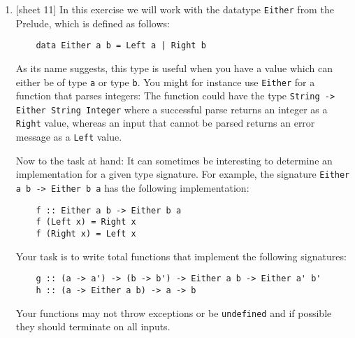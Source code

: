 \documentclass{article}
\def\code#1{\texttt{#1}}
\begin{document}
\begin{enumerate}
    \item {[sheet 11]} In this exercise we will work with the datatype \code{Either} from the Prelude, which is defined as follows:
        \begin{verbatim}
    data Either a b = Left a | Right b
        \end{verbatim}
        As its name suggests, this type is useful when you have a value which can either be of type \code{a} or type \code{b}. You might for instance use \code{Either} for a function that parses integers: The function could have the type \code{String -> Either String Integer} where a successful parse returns an integer as a \code{Right} value, whereas an input that cannot be parsed returns an error message as a \code{Left} value. \par
        Now to the task at hand: It can sometimes be interesting to determine an implementation for a given type signature. For example, the signature \code{Either a b -> Either b a} has the following implementation:
        \begin{verbatim}
    f :: Either a b -> Either b a
    f (Left x) = Right x
    f (Right x) = Left x
        \end{verbatim}
        Your task is to write total functions that implement the following signatures:
        \begin{verbatim}
    g :: (a -> a') -> (b -> b') -> Either a b -> Either a' b'
    h :: (a -> Either a b) -> a -> b
        \end{verbatim}
        Your functions may not throw exceptions or be \code{undefined} and if possible they should terminate on all inputs.
\end{enumerate}
\end{document}
